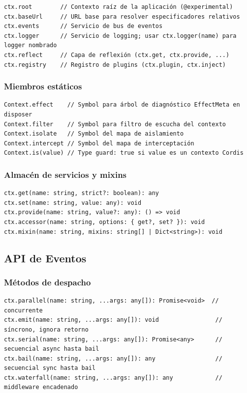 \documentclass[11pt,a4paper]{article}
\begin{document}
\begin{lstlisting}
ctx.root        // Contexto raíz de la aplicación (@experimental)
ctx.baseUrl     // URL base para resolver especificadores relativos
ctx.events      // Servicio de bus de eventos
ctx.logger      // Servicio de logging; usar ctx.logger(name) para logger nombrado
ctx.reflect     // Capa de reflexión (ctx.get, ctx.provide, ...)
ctx.registry    // Registro de plugins (ctx.plugin, ctx.inject)
\end{lstlisting}


\subsubsection*{Miembros estáticos}


\begin{lstlisting}
Context.effect    // Symbol para árbol de diagnóstico EffectMeta en disposer
Context.filter    // Symbol para filtro de escucha del contexto
Context.isolate   // Symbol del mapa de aislamiento
Context.intercept // Symbol del mapa de interceptación
Context.is(value) // Type guard: true si value es un contexto Cordis
\end{lstlisting}


\subsubsection*{Almacén de servicios y mixins}


\begin{lstlisting}
ctx.get(name: string, strict?: boolean): any
ctx.set(name: string, value: any): void
ctx.provide(name: string, value?: any): () => void
ctx.accessor(name: string, options: { get?, set? }): void
ctx.mixin(name: string, mixins: string[] | Dict<string>): void
\end{lstlisting}


\subsection*{API de Eventos}


\subsubsection*{Métodos de despacho}


\begin{lstlisting}
ctx.parallel(name: string, ...args: any[]): Promise<void>  // concurrente
ctx.emit(name: string, ...args: any[]): void                // síncrono, ignora retorno
ctx.serial(name: string, ...args: any[]): Promise<any>      // secuencial async hasta bail
ctx.bail(name: string, ...args: any[]): any                 // secuencial sync hasta bail
ctx.waterfall(name: string, ...args: any[]): any            // middleware encadenado
\end{lstlisting}
\end{document}
